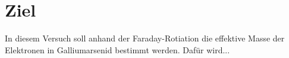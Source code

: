\section{Ziel}
\label{sec:Ziel}
In diesem Versuch soll anhand der Faraday-Rotiation die effektive Masse der
Elektronen in Galliumarsenid bestimmt werden. Dafür wird...
